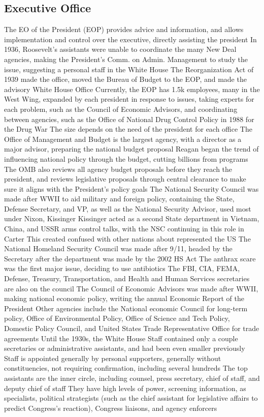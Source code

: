 \documentclass[11 pt, twoside]{article}
\newenvironment{outline*}
{
	\begin{outline}[enumerate]
	}
	{\end{outline}
}
\begin{document}
\subsection{Executive Office}
\begin{outline*}
\1 The EO of the President (EOP) provides advice and information, and allows implementation and control over the executive, directly assisting the president
\2 In 1936, Roosevelt’s assistants were unable to coordinate the many New Deal agencies, making the President’s Comm. on Admin. Management to study the issue, suggesting a personal staff in the White House
\2 The Reorganization Act of 1939 made the office, moved the Bureau of Budget to the EOP, and made the advisory White House Office
\1 Currently, the EOP has 1.5k employees, many in the West Wing, expanded by each president in response to issues, taking experts for each problem, such as the Council of Economic Advisors, and coordinating between agencies, such as the Office of National Drug Control Policy in 1988 for the Drug War
\2 The size depends on the need of the president for each office
\1 The Office of Management and Budget is the largest agency, with a director as a major advisor, preparing the national budget proposal
\2 Reagan began the trend of influencing national policy through the budget, cutting billions from programs
\2 The OMB also reviews all agency budget proposals before they reach the president, and reviews legislative proposals through central clearance to make sure it aligns with the President’s policy goals
\1 The National Security Council was made after WWII to aid military and foreign policy, containing the State, Defense Secretary, and VP, as well as the National Security Advisor, used most under Nixon, Kissinger
\2 Kissinger acted as a second State department in Vietnam, China, and USSR arms control talks, with the NSC continuing in this role in Carter
\2 This created confused with other nations about represented the US
\1 The National Homeland Security Council was made after 9/11, headed by the Secretary after the department was made by the 2002 HS Act
\2 The anthrax scare was the first major issue, deciding to use antibiotics
\2 The FBI, CIA, FEMA, Defense, Treasury, Transportation, and Health and Human Services secretaries are also on the council
\1 The Council of Economic Advisors was made after WWII, making national economic policy, writing the annual Economic Report of the President
\1 Other agencies include the National economic Council for long-term policy, Office of Environmental Policy, Office of Science and Tech Policy, Domestic Policy Council, and United States Trade Representative Office for trade agreements
\1 Until the 1930s, the White House Staff contained only a couple secretaries or administrative assistants, and had been even smaller previously
\2 Staff is appointed generally by personal supporters, generally without constituencies, not requiring confirmation, including several hundreds
\2 The top assistants are the inner circle, including counsel, press secretary, chief of staff, and deputy chief of staff
\2 They have high levels of power, screening information, as specialists, political strategists (such as the chief assistant for legislative affairs to predict Congress’s reaction), Congress liaisons, and agency enforcers
\end{outline*}
\end{document}
